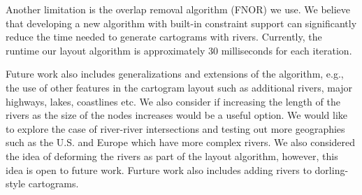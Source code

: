 Another limitation is the overlap removal algorithm (FNOR) we use.
We believe that developing a new algorithm with built-in constraint support can significantly reduce the time needed to generate cartograms with rivers. Currently, the runtime our layout algorithm is approximately 30 milliseconds for each iteration.

Future work also includes generalizations and extensions of the algorithm, e.g., the use of other features in the cartogram layout such as additional rivers, major highways, lakes, coastlines etc.
We also consider if increasing the length of the rivers as the size of the nodes increases would be a useful option.
We would like to explore the case of river-river intersections and testing out more geographies such as the U.S. and Europe which have more complex rivers.
We also considered the idea of deforming the rivers as part of the layout algorithm, however, this idea is open to future work.
Furture work also includes adding rivers to dorling-style cartograms.
